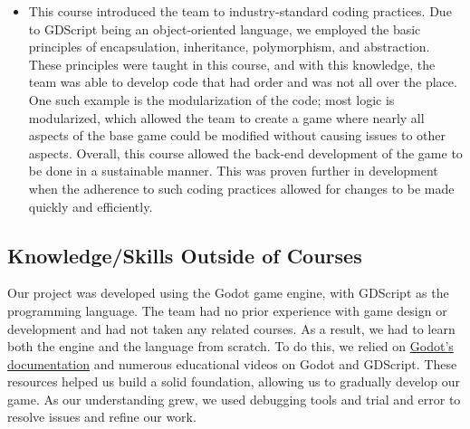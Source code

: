 \documentclass{article}
\begin{document}
\begin{itemize}
\begin{itemize}
        \item This course introduced the team to industry-standard coding practices. Due to GDScript being an object-oriented language, we employed the basic principles of encapsulation, inheritance, polymorphism, and abstraction. These principles were taught in this course, and with this knowledge, the team was able to develop code that had order and was not all over the place. One such example is the modularization of the code; most logic is modularized, which allowed the team to create a game where nearly all aspects of the base game could be modified without causing issues to other aspects. Overall, this course allowed the back-end development of the game to be done in a sustainable manner. This was proven further in development when the adherence to such coding practices allowed for changes to be made quickly and efficiently.
    \end{itemize}
\end{itemize}

\subsection{Knowledge/Skills Outside of Courses}


Our project was developed using the Godot game engine, with GDScript as the programming language. The team had no prior experience with game design or development and had not taken any related courses. As a result, we had to learn both the engine and the language from scratch. To do this, we relied on \href{https://docs.godotengine.org/}{Godot's documentation} and numerous educational videos on Godot and GDScript. These resources helped us build a solid foundation, allowing us to gradually develop our game. As our understanding grew, we used debugging tools and trial and error to resolve issues and refine our work.
\end{document}
